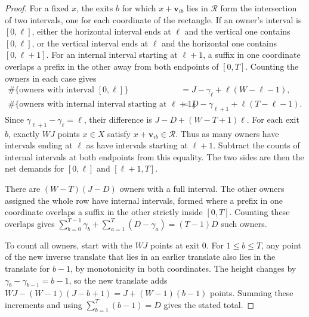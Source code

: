 \documentclass[10pt]{article}
\numberwithin{equation}{section}
\theoremstyle{definition}
\begin{document}
\begin{proof}
For a fixed $x$, the exits $b$ for which $x+\mathbf v_{ib}$ lies in $\mathcal R$ form the intersection of two intervals, one for each coordinate of the rectangle. If an owner's interval is $[0,\ell]$, either the horizontal interval ends at $\ell$ and the vertical one contains $[0,\ell]$, or the vertical interval ends at $\ell$ and the horizontal one contains $[0,\ell+1]$. For an internal interval starting at $\ell+1$, a suffix in one coordinate overlaps a prefix in the other away from both endpoints of $[0,T]$. Counting the owners in each case gives
\[
\begin{aligned}
 \#\{\text{owners with interval }[0,\ell]\}
   &=J-\gamma_\ell+\ell(W-\ell-1),\\
 \#\{\text{owners with internal interval starting at }\ell+1\}
   &=D-\gamma_{\ell+1}+\ell(T-\ell-1).
\end{aligned}
\]
Since $\gamma_{\ell+1}-\gamma_\ell=\ell$, their difference is $J-D+(W-T+1)\ell$. For each exit $b$, exactly $WJ$ points $x\in X$ satisfy $x+\mathbf v_{ib}\in\mathcal R$. Thus as many owners have intervals ending at $\ell$ as have intervals starting at $\ell+1$. Subtract the counts of internal intervals at both endpoints from this equality. The two sides are then the net demands for $[0,\ell]$ and $[\ell+1,T]$.

There are $(W-T)(J-D)$ owners with a full interval. The other owners assigned the whole row have internal intervals, formed where a prefix in one coordinate overlaps a suffix in the other strictly inside $[0,T]$. Counting these overlaps gives $\sum_{b=0}^{T-1}\gamma_b+\sum_{a=1}^{T}(D-\gamma_a)=(T-1)D$ such owners.

To count all owners, start with the $WJ$ points at exit 0. For $1\le b\le T$, any point of the new inverse translate that lies in an earlier translate also lies in the translate for $b-1$, by monotonicity in both coordinates. The height changes by $\gamma_b-\gamma_{b-1}=b-1$, so the new translate adds $WJ-(W-1)(J-b+1)=J+(W-1)(b-1)$ points. Summing these increments and using $\sum_{b=1}^T(b-1)=D$ gives the stated total.
\end{proof}
\end{document}
